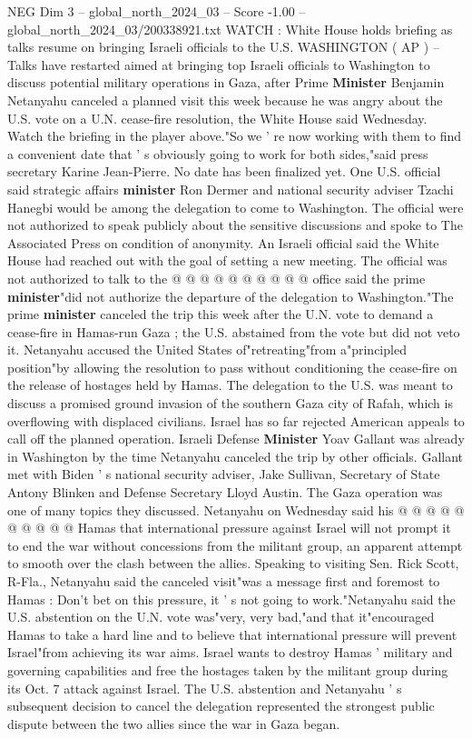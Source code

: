 \begin{textsample}{NEG Dim 3 – global\_north\_2024\_03 – Score -1.00 – global\_north\_2024\_03/200338921.txt}  \label{ex:f3_neg_182}
WATCH : White House holds briefing as talks resume on bringing Israeli officials to the U.S.
WASHINGTON ( AP ) -- Talks have restarted aimed at bringing top Israeli officials to Washington to discuss potential military operations in Gaza, after Prime \textbf{Minister} Benjamin Netanyahu canceled a planned visit this week because he was angry about the U.S. vote on a U.N. cease-fire resolution, the White House said Wednesday.
Watch the briefing in the player above."So we ' re now working with them to find a convenient date that ' s obviously going to work for both sides,"said press secretary Karine Jean-Pierre.
No date has been finalized yet.
One U.S. official said strategic affairs \textbf{minister} Ron Dermer and national security adviser Tzachi Hanegbi would be among the delegation to come to Washington.
The official were not authorized to speak publicly about the sensitive discussions and spoke to The Associated Press on condition of anonymity.
An Israeli official said the White House had reached out with the goal of setting a new meeting.
The official was not authorized to talk to the @ @ @ @ @ @ @ @ @ @ office said the prime \textbf{minister}"did not authorize the departure of the delegation to Washington."The prime \textbf{minister} canceled the trip this week after the U.N. vote to demand a cease-fire in Hamas-run Gaza ; the U.S. abstained from the vote but did not veto it.
Netanyahu accused the United States of"retreating"from a"principled position"by allowing the resolution to pass without conditioning the cease-fire on the release of hostages held by Hamas.
The delegation to the U.S. was meant to discuss a promised ground invasion of the southern Gaza city of Rafah, which is overflowing with displaced civilians.
Israel has so far rejected American appeals to call off the planned operation.
Israeli Defense \textbf{Minister} Yoav Gallant was already in Washington by the time Netanyahu canceled the trip by other officials.
Gallant met with Biden ' s national security adviser, Jake Sullivan, Secretary of State Antony Blinken and Defense Secretary Lloyd Austin.
The Gaza operation was one of many topics they discussed.
Netanyahu on Wednesday said his @ @ @ @ @ @ @ @ @ @ Hamas that international pressure against Israel will not prompt it to end the war without concessions from the militant group, an apparent attempt to smooth over the clash between the allies.
Speaking to visiting Sen.
Rick Scott, R-Fla., Netanyahu said the canceled visit"was a message first and foremost to Hamas : Don't bet on this pressure, it ' s not going to work."Netanyahu said the U.S. abstention on the U.N. vote was"very, very bad,"and that it"encouraged Hamas to take a hard line and to believe that international pressure will prevent Israel"from achieving its war aims.
Israel wants to destroy Hamas ' military and governing capabilities and free the hostages taken by the militant group during its Oct. 7 attack against Israel.
The U.S. abstention and Netanyahu ' s subsequent decision to cancel the delegation represented the strongest public dispute between the two allies since the war in Gaza began.

\end{textsample}

